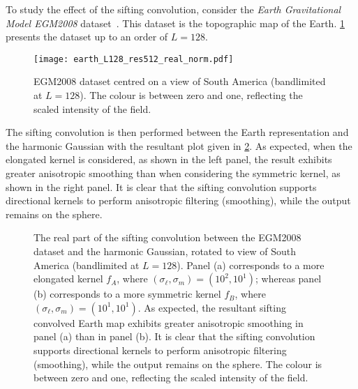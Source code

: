 To study the effect of the sifting convolution, consider the \emph{Earth Gravitational Model EGM2008} dataset~\cite{Pavlis2013}.
This dataset is the topographic map of the Earth.
\cref{fig:chapter2_earth} presents the dataset up to an order of \(L=128\).
%
\begin{figure}[htp]
	\centering
	\texttt{[image: earth\_L128\_res512\_real\_norm.pdf]}
	\caption{
		EGM2008 dataset centred on a view of South America (bandlimited at \(L=128\)).
		The colour is between zero and one, reflecting the scaled intensity of the field.
	}\label{fig:chapter2_earth}
\end{figure}
%
The sifting convolution is then performed between the Earth representation and the harmonic Gaussian with the resultant plot given in \cref{fig:chapter2_convolved}.
As expected, when the elongated kernel is considered, as shown in the left panel, the result exhibits greater anisotropic smoothing than when considering the symmetric kernel, as shown in the right panel.
It is clear that the sifting convolution supports directional kernels to perform anisotropic filtering (smoothing), while the output remains on the sphere.

\begin{figure}[htp]
	\centering
	\hfill
	\caption{
		The real part of the sifting convolution between the EGM2008 dataset and the harmonic Gaussian, rotated to view of South America (bandlimited at \(L=128\)).
		Panel (a) corresponds to a more elongated kernel \(f_{A}\), where \((\sigma_{\ell},\sigma_{m}) = (10^{2}, 10^{1})\); whereas panel (b) corresponds to a more symmetric kernel \(f_{B}\), where \((\sigma_{\ell},\sigma_{m}) = (10^{1}, 10^{1})\).
		As expected, the resultant sifting convolved Earth map exhibits greater anisotropic smoothing in panel (a) than in panel (b).
		It is clear that the sifting convolution supports directional kernels to perform anisotropic filtering (smoothing), while the output remains on the sphere.
		The colour is between zero and one, reflecting the scaled intensity of the field.
	}\label{fig:chapter2_convolved}
\end{figure}

